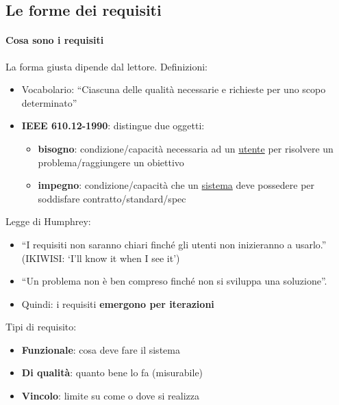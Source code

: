 \documentclass[12pt]{extarticle}
\begin{document}
\subsection{Le forme dei requisiti}
\paragraph{Cosa sono i requisiti}
La forma giusta dipende dal lettore. Definizioni:
\begin{itemize}
    \item Vocabolario: ``Ciascuna delle qualità necessarie e richieste per uno scopo determinato''
    \item \textbf{IEEE 610.12-1990}: distingue due oggetti:
    \begin{itemize}
        \item \textbf{bisogno}: condizione/capacità necessaria ad un \underline{utente} per risolvere un problema/raggiungere un obiettivo
        \item \textbf{impegno}: condizione/capacità che un \underline{sistema} deve possedere per soddisfare contratto/standard/spec
    \end{itemize} 
\end{itemize}

\noindent Legge di Humphrey: 
\begin{itemize}
    \item ``I requisiti non saranno chiari finché gli utenti non inizieranno a usarlo.'' (IKIWISI: `I'll know it when I see it')
    \item ``Un problema non è ben compreso finché non si sviluppa una soluzione''.
    \item Quindi: i requisiti \textbf{emergono per iterazioni}
\end{itemize}

\noindent Tipi di requisito:
\begin{itemize}
    \item \textbf{Funzionale}: cosa deve fare il sistema
    \item \textbf{Di qualità}: quanto bene lo fa (misurabile)
    \item \textbf{Vincolo}: limite su come o dove si realizza
\end{itemize}
\end{document}
